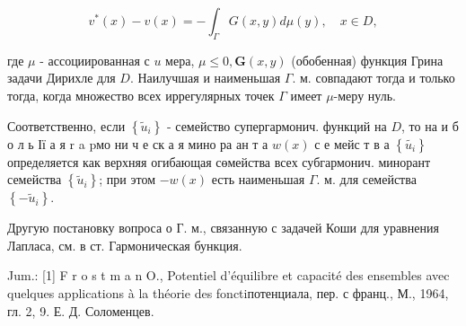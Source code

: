 \documentclass[10pt]{article}
\begin{document}
\[

v^{*}(x)-v(x)=-\int_{\Gamma} G(x, y) d \mu(y), \quad x \in D,

\]



где $\mu$ - ассоциированная с $u$ мера, $\mu \leqslant 0, \boldsymbol{G}(x, y)$ (обобенная) функция Грина задачи Дирихле для $D$. Наилучшая и наименьшая $\Gamma$. м. совпадают тогда и только тогда, когда множество всех иррегулярных точек $\Gamma$ имеет $\mu$-меру нуль.



Соответственно, если $\left\{\tilde{u}_{i}\right\}$ - семейство супергармонич. функций на $D$, то на и б о л ь Ії а я $\mathrm{r}$ a pмо ни ч е ск а я мино ра ан т а $w(x)$ с е мейс т в а $\left\{\tilde{u_{i}}\right\}$ определяется как верхняя огибающая сөмейства всех субгармонич. минорант семейства $\left\{\tilde{u}_{i}\right\}$; при этом $-w(x)$ есть наименьшая $\Gamma$. м. для семейства $\left\{-\tilde{u}_{i}\right\}$.



Другую постановку вопроса о Г. м., связанную с задачей Коши для уравнения Лапласа, см. в ст. Гармоническая бункция.



Jum.: [1] F r o s t m a n O., Potentiel d'équilibre et capacité des ensembles avec quelques applications à la théorie des fonctiпотенциала, пер. с франц., М., 1964, гл. 2, 9. Е. Д. Соломенцев.
\end{document}
